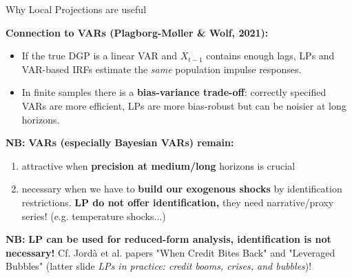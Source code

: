 \documentclass{beamer}
\begin{document}
\begin{frame}{Why Local Projections are useful}
\small

\textbf{Connection to VARs (Plagborg-Møller \& Wolf, 2021):}
\begin{itemize}
  \item If the true DGP is a linear VAR and $X_{t-1}$ contains enough lags,
        LPs and VAR-based IRFs estimate the \emph{same} population impulse responses.
  \item In finite samples there is a \textbf{bias-variance trade-off}:
        correctly specified VARs are more efficient,
        LPs are more bias-robust but can be noisier at long horizons.
\end{itemize}

\textbf{NB:} \textbf{VARs (especially Bayesian VARs) remain:}
\begin{enumerate}
    \item attractive when \textbf{precision at medium/long} horizons is crucial
    \item necessary when we have to\textbf{ build our exogenous shocks }by identification restrictions. \textbf{LP do not offer identification,} they need narrative/proxy series! (e.g. temperature shocks...)
\end{enumerate}

\textbf{NB:} \textbf{LP can be used for reduced-form analysis, identification is not necessary!} Cf. Jordà et al. papers "When Credit Bites Back" and "Leveraged Bubbles" (latter slide \textit{LPs in practice: credit booms, crises, and bubbles})!



\end{frame}
\end{document}
